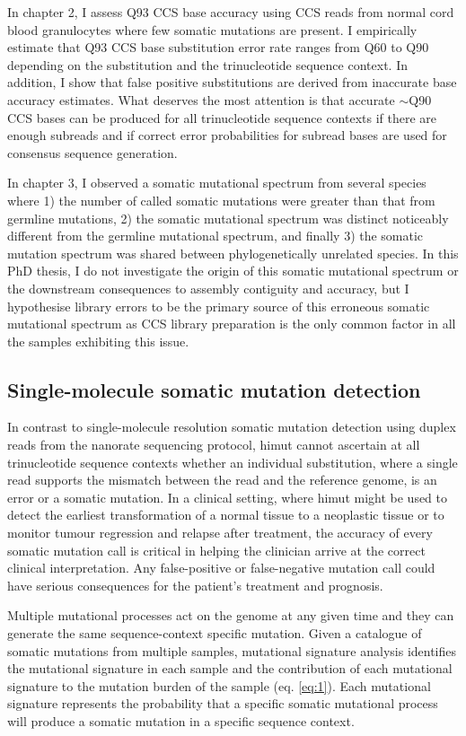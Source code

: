 In chapter 2, I assess Q93 CCS base accuracy using CCS reads from normal cord blood granulocytes where few somatic mutations are present. I empirically estimate that Q93 CCS base substitution error rate ranges from Q60 to Q90 depending on the substitution and the trinucleotide sequence context. In addition, I show that false positive substitutions are derived from inaccurate base accuracy estimates. What deserves the most attention is that accurate $\sim$Q90 CCS bases can be produced for all trinucleotide sequence contexts if there are enough subreads and if correct error probabilities for subread bases are used for consensus sequence generation. 
 
In chapter 3, I observed a somatic mutational spectrum from several species where 1) the number of called somatic mutations were greater than that from germline mutations, 2) the somatic mutational spectrum was distinct noticeably different from the germline mutational spectrum, and finally 3) the somatic mutation spectrum was shared between phylogenetically unrelated species. In this PhD thesis, I do not investigate the origin of this somatic mutational spectrum or the downstream consequences to assembly contiguity and accuracy, but I hypothesise library errors to be the primary source of this erroneous somatic mutational spectrum as CCS library preparation is the only common factor in all the samples exhibiting this issue. 

\subsection{Single-molecule somatic mutation detection}

In contrast to single-molecule resolution somatic mutation detection using duplex reads from the nanorate sequencing protocol, himut cannot ascertain at all trinucleotide sequence contexts whether an individual substitution, where a single read supports the mismatch between the read and the reference genome, is an error or a somatic mutation. In a clinical setting, where himut might be used to detect the earliest transformation of a normal tissue to a neoplastic tissue or to monitor tumour regression and relapse after treatment, the accuracy of every somatic mutation call is critical in helping the clinician arrive at the correct clinical interpretation. Any false-positive or false-negative mutation call could have serious consequences for the patient’s treatment and prognosis. 

Multiple mutational processes act on the genome at any given time and they can generate the same sequence-context specific mutation. Given a catalogue of somatic mutations from multiple samples, mutational signature analysis identifies the mutational signature in each sample and the contribution of each mutational signature to the mutation burden of the sample (eq. \ref{eq:1}). Each mutational signature represents the probability that a specific somatic mutational process will produce a somatic mutation in a specific sequence context. 


